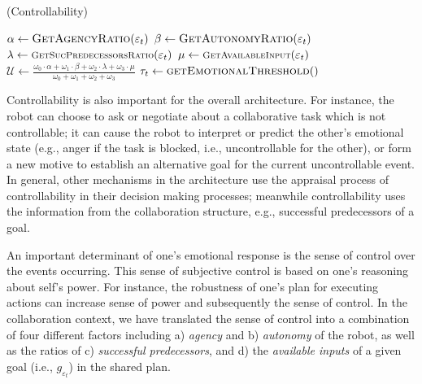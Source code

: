 \documentclass{aamas2016}
\begin{document}
\begin{algorithm}
	\caption{(Controllability)}
	\label{alg:controllability}
	\begin{algorithmic}[1]
			\Statex
			\State $\alpha \gets \Call{GetAgencyRatio}{\varepsilon_t}$ 
			\State $\beta \gets \Call{GetAutonomyRatio}{\varepsilon_t}$
			\Statex
			\State $\lambda \gets
			\Call{\small{GetSucPredecessorsRatio}}{\varepsilon_t}$
			\State $\mu \gets
			\Call{\small{GetAvailableInput}}{\varepsilon_t}$
			\Statex
			\State $\mathcal{U} \gets
			\frac{\omega_{0}\cdot \alpha + \omega_{1}\cdot \beta + \omega_{2}\cdot
			\lambda + \omega_{3}\cdot \mu}{\omega_{0} + \omega_{1} + \omega_{2} +
			\omega_{3}}$
			\Statex
			\State $\tau_{t} \gets \Call{getEmotionalThreshold}{ }$
			\Statex
				\State {}
			\Else
				\State {}
			\EndIf
		\EndFunction
	\end{algorithmic}
\end{algorithm}

Controllability is also important for the overall architecture. For instance,
the robot can choose to ask or negotiate about a collaborative task which is
not controllable; it can cause the robot to interpret or predict the other's
emotional state (e.g., anger if the task is blocked, i.e., uncontrollable for
the other), or form a new motive to establish an alternative goal for the
current uncontrollable event. In general, other mechanisms in the architecture
use the appraisal process of controllability in their decision making processes;
meanwhile controllability uses the information from the collaboration structure,
e.g., successful predecessors of a goal.

An important determinant of one's emotional response is the sense of control
over the events occurring. This sense of subjective control is based on one's
reasoning about self's power. For instance, the robustness of one's plan for
executing actions can increase sense of power and subsequently the sense of
control. In the collaboration context, we have translated the sense of control
into a combination of four different factors including a) \textit{agency} and b)
\textit{autonomy} of the robot, as well as the ratios of c) \textit{successful
predecessors}, and d) the \textit{available inputs} of a given goal
(i.e., $\mathit{g}_{\varepsilon_t}$) in the shared plan.
\end{document}
